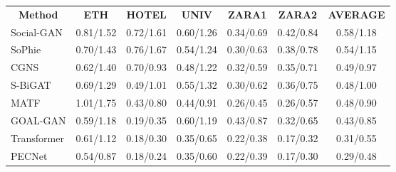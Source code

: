 \documentclass[10pt,twocolumn,letterpaper]{article}
\begin{document}
{\small
	
	
}




\begin{table*}[htb!]
	\centering
	\begin{tabular}{l|r|r|r|r|r|c}
\multicolumn{1}{c|}{\textbf{Method}} & \multicolumn{1}{c|}{\textbf{ETH}}        & \multicolumn{1}{c|}{\textbf{HOTEL}} & \multicolumn{1}{c|}{\textbf{UNIV}} & \multicolumn{1}{c|}{\textbf{ZARA1}} & \multicolumn{1}{c|}{\textbf{ZARA2}} & 
		\multicolumn{1}{c}{\textbf{AVERAGE}}\\ \hlineB{3}
Social-GAN \cite{gupta2018social}                                  & 0.81/1.52                      & 0.72/1.61                 & 0.60/1.26                & 0.34/0.69                 & 0.42/0.84 & 0.58/1.18                 \\
		SoPhie \cite{sadeghian2019sophie}                                 & 0.70/1.43                      & 0.76/1.67                 & 0.54/1.24                & 0.30/0.63                 & 0.38/0.78 & 0.54/1.15                 \\
		CGNS \cite{li2019cgns}                                   & 0.62/1.40                       & 0.70/0.93                  & 0.48/1.22                & 0.32/0.59                 & 0.35/0.71   & 0.49/0.97               \\
		S-BiGAT \cite{Kosaraju2019BIGAT}                                & 0.69/1.29                      & 0.49/1.01                 & 0.55/1.32                & 0.30/0.62                  & 0.36/0.75 &  0.48/1.00           \\
		MATF \cite{zhao2019multi}                                   & 1.01/1.75                      & 0.43/0.80                  & 0.44/0.91                & 0.26/0.45                 & 0.26/0.57      & 0.48/0.90              \\
		GOAL-GAN \cite{Dendorfer_2020_ACCV}                               & 0.59/1.18                      & 0.19/0.35                 & 0.60/1.19                & 0.43/0.87                 & 0.32/0.65  & 0.43/0.85                \\
		Transformer \cite{giuliari2020transformer}                            & 0.61/1.12                      & 0.18/0.30                 & 0.35/0.65                & 0.22/0.38                 & 0.17/0.32 & 0.31/0.55             \\
		PECNet \cite{mangalam2020not}                                 & 0.54/0.87 & 0.18/0.24                 & 0.35/0.60                & 0.22/0.39                 & 0.17/0.30  & 0.29/0.48                \\

\end{tabular}
\end{table*}
\end{document}
